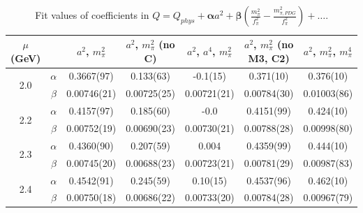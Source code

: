 \documentclass[12pt]{extarticle}
\begin{document}
\begin{table}[h!]
\begin{center}
\begin{tabular}{|c c|c|c|c|c|c|}
\hline
$\mu$ (GeV) &  & $a^2$, $m_\pi^2$& $a^2$, $m_\pi^2$ (no C)& $a^2$, $a^4$, $m_\pi^2$& $a^2$, $m_\pi^2$ (no M3, C2)& $a^2$, $m_\pi^2$, $m_\pi^4$\\
\hline
\multirow{2}{0.5in}{2.0} & $\alpha$ & 0.3667(97)& 0.133(63)& -0.1(15)& 0.371(10)& 0.376(10)\\
 & $\beta$ & 0.00746(21)& 0.00725(25)& 0.00721(21)& 0.00784(30)& 0.01003(86)\\
\hline
\multirow{2}{0.5in}{2.2} & $\alpha$ & 0.4157(97)& 0.185(60)& -0.0& 0.4151(99)& 0.424(10)\\
 & $\beta$ & 0.00752(19)& 0.00690(23)& 0.00730(21)& 0.00788(28)& 0.00998(80)\\
\hline
\multirow{2}{0.5in}{2.3} & $\alpha$ & 0.4360(90)& 0.207(59)& 0.004& 0.4359(99)& 0.444(10)\\
 & $\beta$ & 0.00745(20)& 0.00688(23)& 0.00723(21)& 0.00781(29)& 0.00987(83)\\
\hline
\multirow{2}{0.5in}{2.4} & $\alpha$ & 0.4542(91)& 0.245(59)& 0.10(15)& 0.4537(96)& 0.462(10)\\
 & $\beta$ & 0.00750(18)& 0.00686(22)& 0.00733(20)& 0.00784(28)& 0.00967(79)\\
\hline
\end{tabular}
\caption{Fit values of coefficients in $Q = Q_{phys} + \mathbf{\alpha} a^2 + \mathbf{\beta}\left(\frac{m_\pi^2}{f_\pi^2}-\frac{m_{\pi,PDG}^2}{f_\pi^2}\right) + \ldots$.}
\end{center}
\end{table}




















\clearpage
\end{document}
